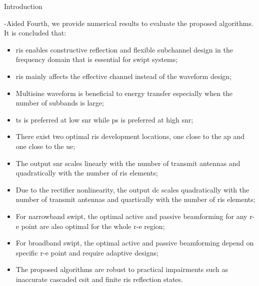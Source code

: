 \begin{section}{Introduction}
\begin{subsection}{-Aided }
		Fourth, we provide numerical results to evaluate the proposed algorithms. It is concluded that:
		\begin{itemize}
			\item \gls{ris} enables constructive reflection and flexible subchannel design in the frequency domain that is essential for \gls{swipt} systems;
			\item \gls{ris} mainly affects the effective channel instead of the waveform design;
			\item Multisine waveform is beneficial to energy transfer especially when the number of subbands is large;
			\item \gls{ts} is preferred at low \gls{snr} while \gls{ps} is preferred at high \gls{snr};
			\item There exist two optimal \gls{ris} development locations, one close to the \gls{ap} and one close to the \gls{ue};
			\item The output \gls{snr} scales linearly with the number of transmit antennas and quadratically with the number of \gls{ris} elements;
			\item Due to the rectifier nonlinearity, the output \gls{dc} scales quadratically with the number of transmit antennas and quartically with the number of \gls{ris} elements;
			\item For narrowband \gls{swipt}, the optimal active and passive beamforming for any \gls{r-e} point are also optimal for the whole \gls{r-e} region;
			\item For broadband \gls{swipt}, the optimal active and passive beamforming depend on specific \gls{r-e} point and require adaptive designs;
			\item The proposed algorithms are robust to practical impairments such as inaccurate cascaded \gls{csit} and finite \gls{ris} reflection states.
		\end{itemize}
	\end{subsection}
\end{section}

